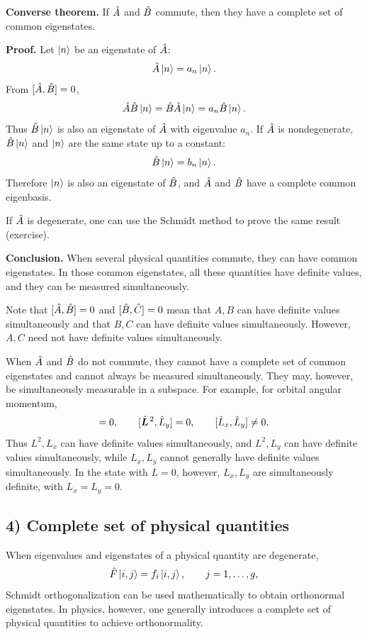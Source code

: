 \textbf{Converse theorem.} If $\hat{A}$ and $\hat{B}$ commute, then they have a complete set of common eigenstates.

\textbf{Proof.} Let $\left|n\right\rangle$ be an eigenstate of $\hat{A}$:
\begin{equation}
\hat{A}\left|n\right\rangle=a_n\left|n\right\rangle.
\end{equation}
From $[\hat{A},\hat{B}]=0$,
\begin{equation}
\hat{A}\hat{B}\left|n\right\rangle=\hat{B}\hat{A}\left|n\right\rangle=a_n\hat{B}\left|n\right\rangle.
\end{equation}
Thus $\hat{B}\left|n\right\rangle$ is also an eigenstate of $\hat{A}$ with eigenvalue $a_n$. If $\hat{A}$ is nondegenerate, $\hat{B}\left|n\right\rangle$ and $\left|n\right\rangle$ are the same state up to a constant:
\begin{equation}
\hat{B}\left|n\right\rangle=b_n\left|n\right\rangle.
\end{equation}
Therefore $\left|n\right\rangle$ is also an eigenstate of $\hat{B}$, and $\hat{A}$ and $\hat{B}$ have a complete common eigenbasis.

If $\hat{A}$ is degenerate, one can use the Schmidt method to prove the same result (exercise).

\textbf{Conclusion.} When several physical quantities commute, they can have common eigenstates. In those common eigenstates, all these quantities have definite values, and they can be measured simultaneously.

Note that $[\hat{A},\hat{B}]=0$ and $[\hat{B},\hat{C}]=0$ mean that $A,B$ can have definite values simultaneously and that $B,C$ can have definite values simultaneously. However, $A,C$ need not have definite values simultaneously.

When $\hat{A}$ and $\hat{B}$ do not commute, they cannot have a complete set of common eigenstates and cannot always be measured simultaneously. They may, however, be simultaneously measurable in a subspace. For example, for orbital angular momentum,
\begin{equation}
[\op{\vect L}^{\,2},\op L_x]=0,\qquad [\op{\vect L}^{\,2},\op L_y]=0,\qquad [\op L_x,\op L_y]\ne0.
\end{equation}
Thus $L^2,L_x$ can have definite values simultaneously, and $L^2,L_y$ can have definite values simultaneously, while $L_x,L_y$ cannot generally have definite values simultaneously. In the state with $L=0$, however, $L_x,L_y$ are simultaneously definite, with $L_x=L_y=0$.
\subsection*{4) Complete set of physical quantities}
When eigenvalues and eigenstates of a physical quantity are degenerate,
\begin{equation}
\hat{F}\left|i,j\right\rangle=f_i\left|i,j\right\rangle,\qquad j=1,\ldots,g,
\end{equation}
Schmidt orthogonalization can be used mathematically to obtain orthonormal eigenstates. In physics, however, one generally introduces a complete set of physical quantities to achieve orthonormality.

